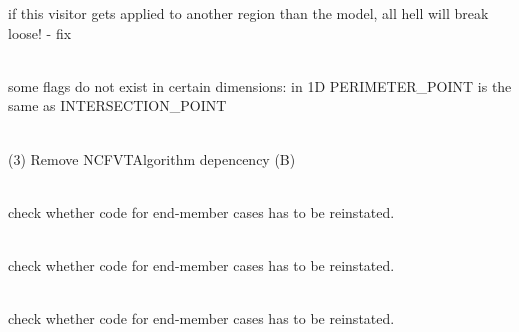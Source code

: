 \begin{DoxyRefList}
%
if this visitor gets applied to another region than the model, all hell will break loose! -\/ fix 
\item[Member \doxylink{group___c_s_m_p__global__enumerations_ga65b4b9788928fc2599d5cc1d1960942a}{csmp\+::TOPOTYPE} ]\hfill \\
\label{todo__todo000024}%
%
some flags do not exist in certain dimensions\+: in 1D PERIMETER\+\_\+\+POINT is the same as INTERSECTION\+\_\+\+POINT  
\item[Class \doxylink{classcsmp_1_1_two_phase_explicit_node_centered_f_v_transport}{csmp\+::Two\+Phase\+Explicit\+Node\+Centered\+FVTransport\texorpdfstring{$<$}{<} dim, STP \texorpdfstring{$>$}{>}} ]\hfill \\
\label{todo__todo000051}%
%
(3) Remove NCFVTAlgorithm depencency (B) 
\item[Member \doxylink{classcsmp_1_1_two_phase_flow_functions_a41d0e0204c5ea1eecd96e04f41376dd8}{csmp\+::Two\+Phase\+Flow\+Functions\texorpdfstring{$<$}{<} dim, USER \texorpdfstring{$>$}{>}\+::dfds} (\doxylink{classcsmp_1_1_element}{Element$<$ dim $>$} \texorpdfstring{$\ast$}{*}const, uint32\+\_\+t phase) const]\hfill \\
\label{todo__todo000233}%
%
check whether code for end-\/member cases has to be reinstated.  
\item[Member \doxylink{classcsmp_1_1_two_phase_flow_functions_a27eab09c3d0ae37c4e37ec13dd8df655}{csmp\+::Two\+Phase\+Flow\+Functions\texorpdfstring{$<$}{<} dim, USER \texorpdfstring{$>$}{>}\+::dfds\+\_\+at} (\doxylink{classcsmp_1_1_element}{Element$<$ dim $>$} \texorpdfstring{$\ast$}{*}const, double sw) const]\hfill \\
\label{todo__todo000234}%
%
check whether code for end-\/member cases has to be reinstated.  
\item[Member \doxylink{classcsmp_1_1_two_phase_flow_functions_a22a444b0c017e83b3f9230a1a54c0176}{csmp\+::Two\+Phase\+Flow\+Functions\texorpdfstring{$<$}{<} dim, USER \texorpdfstring{$>$}{>}\+::dfds\+\_\+at\+\_\+\+Numerical} (\doxylink{classcsmp_1_1_element}{Element$<$ dim $>$} \texorpdfstring{$\ast$}{*}const, double sw, double delta\+\_\+s=0.\+001) const]\hfill \\
\label{todo__todo000235}%
%
check whether code for end-\/member cases has to be reinstated.  
\item[Member \doxylink{classcsmp_1_1_two_phase_model_affc076dda4e95cfbdc9c3e12dfbd68a5}{csmp\+::Two\+Phase\+Model\texorpdfstring{$<$}{<} dim \texorpdfstring{$>$}{>}\+::Initialize} (const \doxylink{classcsmp_1_1_element}{Element$<$ dim $>$} \&e)]\hfill \\

\end{DoxyRefList}
